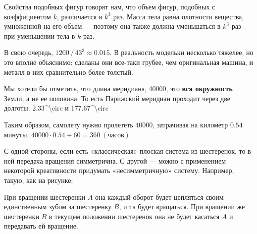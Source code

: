 ﻿
\begin{itemize}
\itA Свойства подобных фигур говорят нам, что объем фигур, подобных с коэффициентом $k$, различается в $k^3$ раз. Масса тела равна плотности вещества, умноженной на его объем — поэтому она также должна уменьшаться в $k^3$ раз при уменьшении тела в $k$ раз.

В свою очередь, $1200\,/\,43^3 \approx 0.015$. В реальность модельки несколько тяжелее, но это вполне объяснимо: сделаны они все-таки грубее, чем оригинальная машина, и металл в них сравнительно более толстый.

\itB Мы хотели бы отметить, что длина меридиана, \SI{40000}{}, это {\bfseries вся окружность} Земли, а не ее половина. То есть Парижский меридиан проходит через две долготы: \SI{2.33^\circ}{} и \SI{177.67^\circ}{}

Таким образом, самолету нужно пролететь \SI{40000}{}, затрачивая на километр $0.54$ минуты. $40000 \cdot 0.54 \div 60 = \SI{360}{(\text{часов})}$.

\itC С одной стороны, если есть «классическая» плоская система из шестеренок, то в ней передача вращения симметрична. С другой — можно с применением некоторой креативности придумать «несимметричную» систему. Например, такую, как на рисунке:

\begin{center}

\end{center}

При вращении шестеренки $A$ она каждый оборот будет цепляться своим единственным зубом за шестеренку $B$, и та будет вращаться. При вращении же шестеренки $B$ в текущем положении шестеренок она не будет касаться $A$ и передавать ей вращение.

\end{itemize}